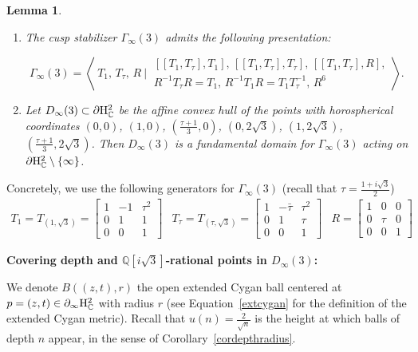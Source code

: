 \documentclass{article}[12pt]
\newcommand{\C}{\mathbb{C}}
\newcommand{\Q}{\mathbb{Q}}
\newtheorem{lem}{Lemma}%
\begin{document}
\begin{lem}\label{d=3Gammainfty}
\begin{enumerate} 
\item The cusp stabilizer $\Gamma_\infty(3)$ admits the following presentation:

$$\Gamma_\infty(3)=\left\langle\ T_1, \, T_\tau, \, R  \ \Big\vert\ 
\begin{array}{c}  \left[ [ T_1,T_\tau ], T_1 \right], \,  \left[ [ T_1,T_\tau ], T_\tau \right], \,\left[ [ T_1,T_\tau ], R \right], \\
R^{-1}T_\tau R=T_1,  \, R^{-1}T_1 R=T_1T_\tau^{-1}, \, R^6
\end{array}\right\rangle.$$


\item Let $D_\infty(3) \subset \partial {\rm H}_\C^2$ be the affine convex hull of the points with horospherical coordinates $(0,0)$, $(1,0)$, $(\frac{\tau +1}{3},0)$, $(0,2\sqrt{3})$, $(1,2\sqrt{3})$, $(\frac{\tau +1}{3},2\sqrt{3})$. Then $D_\infty(3)$ is a fundamental domain for $\Gamma_\infty(3)$ acting on $\partial {\rm H}_\C^2 \setminus \{ \infty \}$.
\end{enumerate}
\end{lem}  
Concretely, we use the following generators for $\Gamma_\infty(3)$ (recall that $\tau=\frac{1+i\sqrt{3}}{2}$)
$$
\begin{array}{ccc} T_1=T_{(1,\sqrt{3})}=\left[ \begin{array}{ccc} 1 & -1 & \tau^2 \\ 0 & 1 & 1 \\ 0 & 0 & 1 \end{array}\right] & 
  T_\tau = T_{(\tau,\sqrt{3})}=\left[ \begin{array}{ccc} 1 & -\bar{\tau} & \tau^2 \\ 0 & 1 & \tau \\ 0 & 0 & 1 \end{array}\right] &
  R=\left[ \begin{array}{ccc} 1 & 0 & 0 \\ 0 & \tau & 0 \\ 0 & 0 & 1 \end{array}\right]
\end{array}$$

{\bf Covering depth and $\Q[i\sqrt{3}]$-rational points in $D_\infty(3)$:}

We denote $B\left((z,t),r\right)$ the open extended Cygan ball centered at $p=(z,t) \in \partial_\infty {\rm H}_\C^2$ with radius $r$ (see Equation~\ref{extcygan} for the definition of the extended Cygan metric). Recall that $u(n)=\frac{2}{\sqrt{n}}$ is the height at which balls of depth $n$ appear, in the sense of Corollary~\ref{cordepthradius}. 
\end{document}
